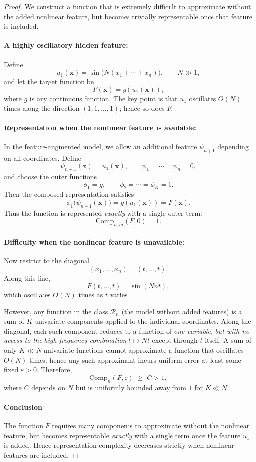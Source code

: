 \documentclass{article}
\begin{document}
\begin{proof}
We construct a function that is extremely difficult to approximate without the
added nonlinear feature, but becomes trivially representable once that feature 
is included.

\paragraph{A highly oscillatory hidden feature:}
Define
\[
u_1(\mathbf{x})=\sin\!\big(N(x_1+\cdots+x_n)\big), \qquad N\gg 1,
\]
and let the target function be
\[
F(\mathbf{x})=g(u_1(\mathbf{x})),
\]
where $g$ is any continuous function.  
The key point is that $u_1$ oscillates $O(N)$ times along the direction 
$(1,1,\dots,1)$; hence so does $F$.

\paragraph{ Representation when the nonlinear feature is available:}
In the feature-augmented model, we allow an additional feature $\psi_{n+1}$ 
depending on all coordinates.  Define
\[
\psi_{n+1}(\mathbf{x}) = u_1(\mathbf{x}), 
\qquad
\psi_1 = \cdots = \psi_n = 0,
\]
and choose the outer functions
\[
\phi_1 = g,
\qquad 
\phi_2=\cdots=\phi_K=0.
\]
Then the composed representation satisfies
\[
\phi_1\big(\psi_{n+1}(\mathbf{x})\big) = g(u_1(\mathbf{x})) = F(\mathbf{x}).
\]
Thus the function is represented \emph{exactly} with a single outer term:
\[
\mathrm{Comp}_{n,m}(F,0) = 1.
\]

\paragraph{Difficulty when the nonlinear feature is unavailable:}
Now restrict to the diagonal
\[
(x_1,\dots,x_n)=(t,\dots,t).
\]
Along this line,
\[
F(t,\dots,t)=\sin(N n t),
\]
which oscillates $O(N)$ times as $t$ varies.

However, any function in the class $\mathcal{R}_n$ (the model without added
features) is a sum of $K$ univariate components applied to the individual
coordinates.  Along the diagonal, each such component reduces to a function of
\emph{one variable, but with no access to the high-frequency combination}
$t \mapsto Nt$ except through $t$ itself.  
A sum of only $K\ll N$ univariate functions cannot approximate a function that
oscillates $O(N)$ times; hence any such approximant incurs uniform error at 
least some fixed $\varepsilon>0$.  Therefore,
\[
\mathrm{Comp}_n(F,\varepsilon) \;\ge\; C > 1,
\]
where $C$ depends on $N$ but is uniformly bounded away from $1$ for 
$K\ll N$.

\paragraph{Conclusion:}
The function $F$ requires many components to approximate without the nonlinear
feature, but becomes representable \emph{exactly} with a single term once the
feature $u_1$ is added.  Hence representation complexity decreases strictly when 
nonlinear features are included.
\end{proof}
\end{document}
